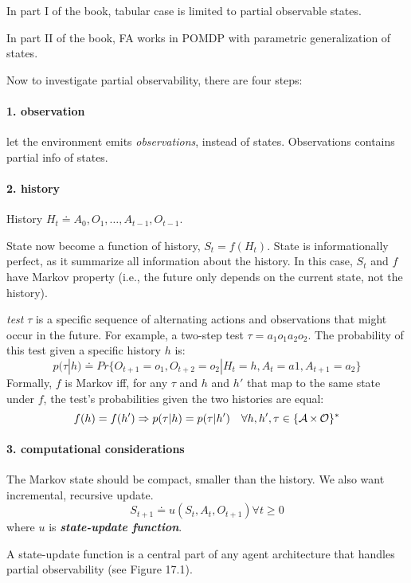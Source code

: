 \documentclass[sutton_barto_notes.tex]{subfiles}
\begin{document}
In part I of the book, tabular case is limited to partial observable states.

In part II of the book, FA works in POMDP with parametric generalization of states.

Now to investigate partial observability, there are four steps:
\paragraph{1. observation} let the environment emits \textit{observations}, instead of states. Observations contains partial info of states.

\paragraph{2. history}
History $H_t \doteq A_0, O_1, \dots, A_{t-1}, O_{t-1}$. 

State now become a function of history, $S_t = f(H_t)$. State is informationally perfect, as it summarize all information about the history. In this case, $S_t$ and $f$ have Markov property (i.e., the future only depends on the current state, not the history).

\textit{test} $\tau$ is a specific sequence of alternating actions and observations that might occur in the future. For example, a two-step test $\tau = a_1o_1a_2o_2$.
The probability of this test given a specific history $h$ is:
$$ p(\tau | h) \doteq Pr\{O_{t+1} = o_1, O_{t+2} = o_2 | H_t = h, A_t = a1, A_{t+1} = a_2\} $$
Formally, $f$ is Markov iff, for any $\tau$ and $h$ and $h'$ that map to the same state under $f$, the test's probabilities given the two histories are equal:
$$ f(h) = f(h') \Rightarrow p(\tau | h) = p(\tau | h') \quad \forall h,h',\tau \in \{ \operatorname*{\mathcal{A}} \times \operatorname*{\mathcal{O}} \}^* $$

\paragraph{3. computational considerations}
The Markov state should be compact, smaller than the history.
We also want incremental, recursive update.
$$ S_{t+1} \doteq u(S_t, A_t, O_{t+1}) \forall t \geq 0 $$
where $u$ is \textbf{\textit{state-update function}}.

A state-update function is a central part of any agent architecture that handles partial observability (see Figure 17.1).
\end{document}
